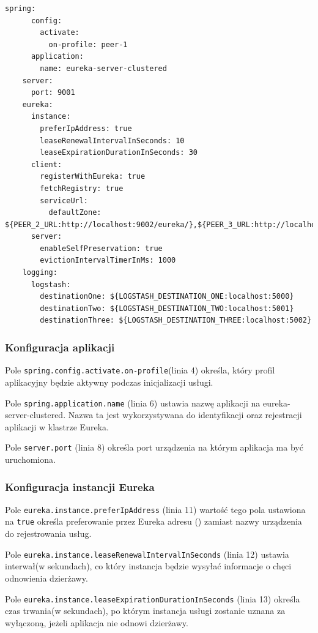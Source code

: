 \begin{lstlisting}[caption=Konfiguracja pierwszego węzła rejestru]
    spring:
      config:
        activate:
          on-profile: peer-1
      application:
        name: eureka-server-clustered
    server:
      port: 9001
    eureka:
      instance:
        preferIpAddress: true
        leaseRenewalIntervalInSeconds: 10
        leaseExpirationDurationInSeconds: 30
      client:
        registerWithEureka: true
        fetchRegistry: true
        serviceUrl:
          defaultZone: ${PEER_2_URL:http://localhost:9002/eureka/},${PEER_3_URL:http://localhost:9003/eureka/}
      server:
        enableSelfPreservation: true
        evictionIntervalTimerInMs: 1000
    logging:
      logstash:
        destinationOne: ${LOGSTASH_DESTINATION_ONE:localhost:5000}
        destinationTwo: ${LOGSTASH_DESTINATION_TWO:localhost:5001}
        destinationThree: ${LOGSTASH_DESTINATION_THREE:localhost:5002}
\end{lstlisting}

\subsubsection{Konfiguracja aplikacji}

Pole \verb|spring.config.activate.on-profile|(linia 4) określa, który profil aplikacyjny będzie aktywny podczas inicjalizacji usługi.

Pole \verb|spring.application.name| (linia 6) ustawia nazwę aplikacji na eureka-server-clustered. Nazwa ta jest wykorzystywana do identyfikacji oraz rejestracji aplikacji w klastrze Eureka.

Pole \verb|server.port| (linia 8) określa port urządzenia na którym aplikacja ma być uruchomiona.

\subsubsection{Konfiguracja instancji Eureka}

Pole \verb|eureka.instance.preferIpAddress| (linia 11) wartość tego pola ustawiona na \verb|true| określa preferowanie przez Eureka adresu  () zamiast nazwy urządzenia do rejestrowania usług.

Pole \verb|eureka.instance.leaseRenewalIntervalInSeconds| (linia 12) ustawia interwał(w sekundach), co który instancja będzie wysyłać informacje o chęci odnowienia dzierżawy.

Pole \verb|eureka.instance.leaseExpirationDurationInSeconds| (linia 13) określa czas trwania(w sekundach), po którym instancja usługi zostanie uznana za wyłączoną, jeżeli aplikacja nie odnowi dzierżawy.

